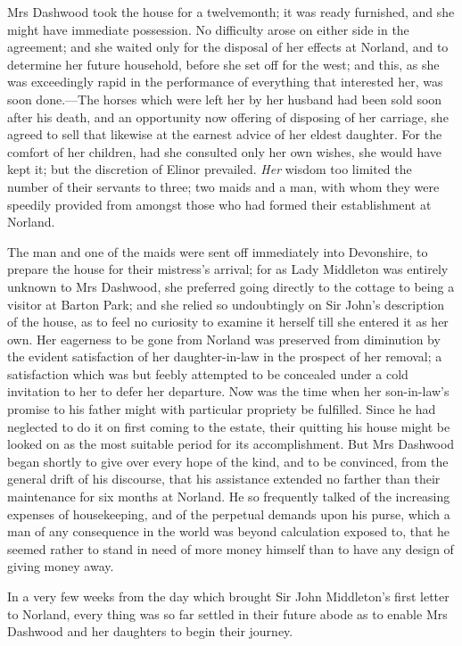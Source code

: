 Mrs Dashwood took the house for a twelvemonth; it was ready furnished, and she might have immediate possession. No difficulty arose on either side in the agreement; and she waited only for the disposal of her effects at Norland, and to determine her future household, before she set off for the west; and this, as she was exceedingly rapid in the performance of everything that interested her, was soon done.—The horses which were left her by her husband had been sold soon after his death, and an opportunity now offering of disposing of her carriage, she agreed to sell that likewise at the earnest advice of her eldest daughter. For the comfort of her children, had she consulted only her own wishes, she would have kept it; but the discretion of Elinor prevailed. \textit{Her} wisdom too limited the number of their servants to three; two maids and a man, with whom they were speedily provided from amongst those who had formed their establishment at Norland.

The man and one of the maids were sent off immediately into Devonshire, to prepare the house for their mistress's arrival; for as Lady Middleton was entirely unknown to Mrs Dashwood, she preferred going directly to the cottage to being a visitor at Barton Park; and she relied so undoubtingly on Sir John's description of the house, as to feel no curiosity to examine it herself till she entered it as her own. Her eagerness to be gone from Norland was preserved from diminution by the evident satisfaction of her daughter-in-law in the prospect of her removal; a satisfaction which was but feebly attempted to be concealed under a cold invitation to her to defer her departure. Now was the time when her son-in-law's promise to his father might with particular propriety be fulfilled. Since he had neglected to do it on first coming to the estate, their quitting his house might be looked on as the most suitable period for its accomplishment. But Mrs Dashwood began shortly to give over every hope of the kind, and to be convinced, from the general drift of his discourse, that his assistance extended no farther than their maintenance for six months at Norland. He so frequently talked of the increasing expenses of housekeeping, and of the perpetual demands upon his purse, which a man of any consequence in the world was beyond calculation exposed to, that he seemed rather to stand in need of more money himself than to have any design of giving money away.

In a very few weeks from the day which brought Sir John Middleton's first letter to Norland, every thing was so far settled in their future abode as to enable Mrs Dashwood and her daughters to begin their journey.


